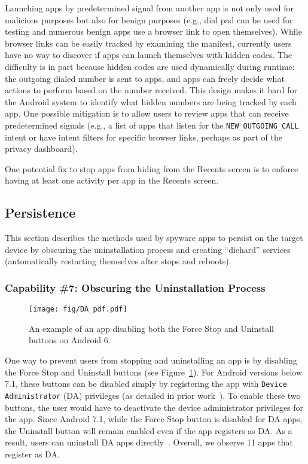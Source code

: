 Launching apps by predetermined signal from another app is not only used for
malicious purposes but also for benign purposes (e.g., dial pad can be used for
testing and numerous benign apps use a browser link to open themselves).
While browser links can be easily tracked by examining the manifest, currently
users have no way to discover if apps can launch themselves with hidden codes.
The difficulty is in part because hidden codes are used dynamically during
runtime: the outgoing dialed number is sent to apps, and apps can freely decide
what actions to perform based on the number received. This design makes it hard
for the Android system to identify what hidden numbers are being tracked by each
app.  One possible mitigation is to allow users to review apps that can receive predetermined signals (e.g., a list of apps that listen for the
\texttt{NEW\_OUTGOING\_CALL} intent or have intent filters for specific browser links,
perhaps as part of the privacy dashboard).

One potential fix to stop apps from hiding from the Recents screen is to enforce
having at least one activity per app in the Recents screen.




\subsection{Persistence}
\label{subsec:persistence}
This section describes the methods used by spyware apps to persist on the target
device by obscuring the uninstallation process and creating ``diehard'' services
(automatically restarting themselves after stops and reboots).


\subsubsection*{Capability \#7: Obscuring the Uninstallation Process}
\begin{figure}[t]
\centering
\texttt{[image: fig/DA\_pdf.pdf]}
\caption[Disabling Uninstall Buttons Example]{An example of an app disabling both the
Force Stop and Uninstall buttons on Android 6.}
\label{fig:da}
\end{figure}
One way to prevent users from stopping and uninstalling an app is by
disabling the Force Stop and Uninstall buttons (see
Figure~\ref{fig:da}).  For Android versions below 7.1,
these buttons can be disabled simply by registering the app with
\texttt{Device Administrator} (DA) privileges (as detailed in prior
work~\cite{shan2019device}). To enable these two buttons, the user
would have to deactivate the device administrator privileges for the
app.
%
Since Android 7.1, while the Force Stop button is disabled for DA
apps, the Uninstall button will remain enabled even if the app
registers as DA.  As a result, users can uninstall DA apps
directly~\cite{shan2019device}. Overall, we observe 11 apps that
register as DA.

